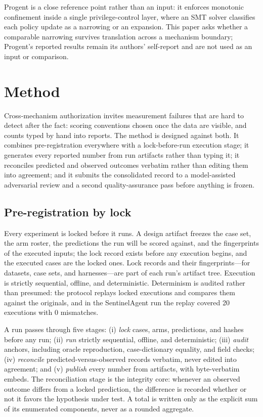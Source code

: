 \documentclass[sigconf,anonymous,nonacm]{acmart}
\begin{document}
Progent \cite{progent} is a close reference point rather than an input: it enforces monotonic confinement inside a single privilege-control layer, where an SMT solver classifies each policy update as a narrowing or an expansion. This paper asks whether a comparable narrowing survives translation across a mechanism boundary; Progent's reported results remain its authors' self-report and are not used as an input or comparison.

\section{Method}
\label{sec:method}

Cross-mechanism authorization invites measurement failures that are hard to detect after the fact: scoring conventions chosen once the data are visible, and counts typed by hand into reports. The method is designed against both. It combines pre-registration everywhere with a lock-before-run execution stage; it generates every reported number from run artifacts rather than typing it; it reconciles predicted and observed outcomes verbatim rather than editing them into agreement; and it submits the consolidated record to a model-assisted adversarial review and a second quality-assurance pass before anything is frozen.

\subsection{Pre-registration by lock}

Every experiment is locked before it runs. A design artifact freezes the case set, the arm roster, the predictions the run will be scored against, and the fingerprints of the executed inputs; the lock record exists before any execution begins, and the executed cases are the locked ones. Lock records and their fingerprints---for datasets, case sets, and harnesses---are part of each run's artifact tree. Execution is strictly sequential, offline, and deterministic. Determinism is audited rather than presumed: the protocol replays locked executions and compares them against the originals, and in the SentinelAgent run the replay covered 20 executions with 0 mismatches.

A run passes through five stages: (i) \emph{lock} cases, arms, predictions, and hashes before any run; (ii) \emph{run} strictly sequential, offline, and deterministic; (iii) \emph{audit} anchors, including oracle reproduction, case-dictionary equality, and field checks; (iv) \emph{reconcile} predicted-versus-observed records verbatim, never edited into agreement; and (v) \emph{publish} every number from artifacts, with byte-verbatim embeds. The reconciliation stage is the integrity core: whenever an observed outcome differs from a locked prediction, the difference is recorded whether or not it favors the hypothesis under test. A total is written only as the explicit sum of its enumerated components, never as a rounded aggregate.
\end{document}
